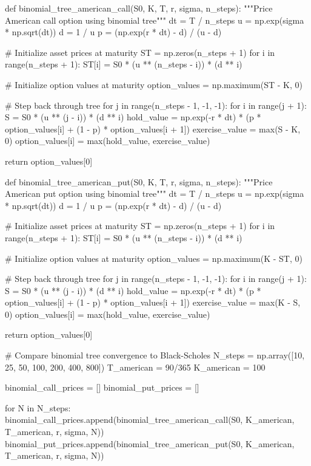 \documentclass[a4paper, 11pt]{article}
\begin{document}
\begin{pycode}
def binomial_tree_american_call(S0, K, T, r, sigma, n_steps):
    """Price American call option using binomial tree"""
    dt = T / n_steps
    u = np.exp(sigma * np.sqrt(dt))
    d = 1 / u
    p = (np.exp(r * dt) - d) / (u - d)

    # Initialize asset prices at maturity
    ST = np.zeros(n_steps + 1)
    for i in range(n_steps + 1):
        ST[i] = S0 * (u ** (n_steps - i)) * (d ** i)

    # Initialize option values at maturity
    option_values = np.maximum(ST - K, 0)

    # Step back through tree
    for j in range(n_steps - 1, -1, -1):
        for i in range(j + 1):
            S = S0 * (u ** (j - i)) * (d ** i)
            hold_value = np.exp(-r * dt) * (p * option_values[i] + (1 - p) * option_values[i + 1])
            exercise_value = max(S - K, 0)
            option_values[i] = max(hold_value, exercise_value)

    return option_values[0]

def binomial_tree_american_put(S0, K, T, r, sigma, n_steps):
    """Price American put option using binomial tree"""
    dt = T / n_steps
    u = np.exp(sigma * np.sqrt(dt))
    d = 1 / u
    p = (np.exp(r * dt) - d) / (u - d)

    # Initialize asset prices at maturity
    ST = np.zeros(n_steps + 1)
    for i in range(n_steps + 1):
        ST[i] = S0 * (u ** (n_steps - i)) * (d ** i)

    # Initialize option values at maturity
    option_values = np.maximum(K - ST, 0)

    # Step back through tree
    for j in range(n_steps - 1, -1, -1):
        for i in range(j + 1):
            S = S0 * (u ** (j - i)) * (d ** i)
            hold_value = np.exp(-r * dt) * (p * option_values[i] + (1 - p) * option_values[i + 1])
            exercise_value = max(K - S, 0)
            option_values[i] = max(hold_value, exercise_value)

    return option_values[0]

# Compare binomial tree convergence to Black-Scholes
N_steps = np.array([10, 25, 50, 100, 200, 400, 800])
T_american = 90/365
K_american = 100

binomial_call_prices = []
binomial_put_prices = []

for N in N_steps:
    binomial_call_prices.append(binomial_tree_american_call(S0, K_american, T_american, r, sigma, N))
    binomial_put_prices.append(binomial_tree_american_put(S0, K_american, T_american, r, sigma, N))


\end{pycode}
\end{document}
